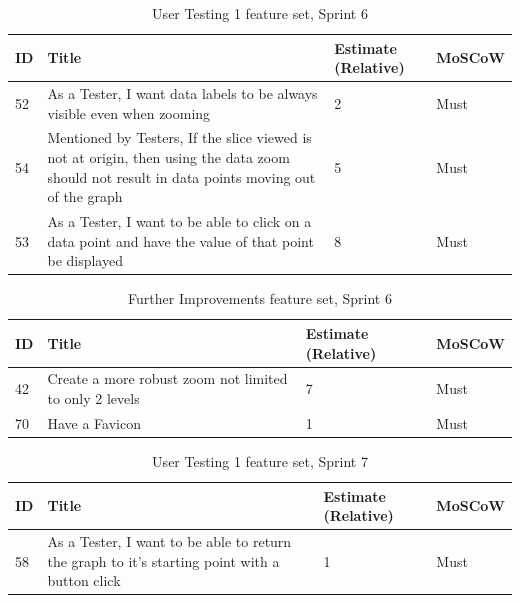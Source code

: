 \begin{table}[hbt!]
    \begin{tabularx}{\textwidth}{ | X | X | X | X | }
        \hline
        ID & Title                                                                                                                                         & Estimate (Relative) & MoSCoW \\
        \hline
        52 & As a Tester, I want data labels to be always visible even when zooming                                                                        & 2                   & Must   \\
        \hline
        54 & Mentioned by Testers, If the slice viewed is not at origin, then using the data zoom should not result in data points moving out of the graph & 5                   & Must   \\
        \hline
        53 & As a Tester, I want to be able to click on a data point and have the value of that point be displayed                                         & 8                   & Must   \\
        \hline
    \end{tabularx}
    \caption{User Testing 1 feature set, Sprint 6}
    \label{sprint6}
\end{table}

\begin{table}[hbt!]
    \begin{tabularx}{\textwidth}{ | X | X | X | X | }
        \hline
        ID & Title                                                  & Estimate (Relative) & MoSCoW \\
        \hline
        42 & Create a more robust zoom not limited to only 2 levels & 7                   & Must   \\
        \hline
        70 & Have a Favicon                                         & 1                   & Must   \\
        \hline
    \end{tabularx}
    \caption{Further Improvements feature set, Sprint 6}
    \label{sprint6-2}
\end{table}

\begin{table}[hbt!]
    \begin{tabularx}{\textwidth}{ | X | X | X | X | }
        \hline
        ID & Title                                                                                         & Estimate (Relative) & MoSCoW \\
        \hline
        58 & As a Tester, I want to be able to return the graph to it's starting point with a button click & 1                   & Must   \\
        \hline
    \end{tabularx}
    \caption{User Testing 1 feature set, Sprint 7}
    \label{sprint7}
\end{table}

